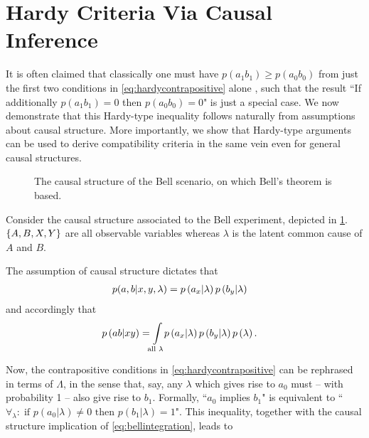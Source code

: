 \section{Hardy Criteria Via Causal Inference}

It is often claimed that classically one must have $p\left(a_1 b_1\right)\geq p\left(a_0 b_0\right)$ from just the first two conditions in  \cref{eq:hardycontrapositive} alone \cite{CabelloHardyInequality}, such that the result ``If additionally $p\left(a_1 b_1\right)=0$ then $p\left(a_0 b_0\right)=0$" is just a special case. We now demonstrate that this Hardy-type inequality follows naturally from assumptions about causal structure. More importantly, we show that Hardy-type arguments can be used to derive compatibility criteria in the same vein even for general causal structures.

\begin{figure}[t!]
\caption{The causal structure of the Bell scenario, on which Bell's theorem is based.}
 \label{fig:BellDAG}
\end{figure}

Consider the causal structure associated to the Bell experiment, depicted in \cref{fig:BellDAG}. $\lbrace{A,B,X,Y\rbrace}$ are all observable variables whereas $\lambda$ is the latent common cause of $A$ and $B$.

The assumption of causal structure dictates that
\begin{align}\begin{split}\label{eq:bellstructure}
p&\lparen a,b|x,y,\lambda\rparen=p\left(a_x|\lambda\right)p\left(b_y|\lambda\right)
\end{split}\end{align}
and accordingly that
\begin{align}\begin{split}\label{eq:bellintegration}
&p\left(ab|xy\right)
=\int\limits_{\mathclap{\text{all }\lambda}}p\left(a_x|\lambda\right)p\left(b_y|\lambda\right)p\left(\lambda\right).
\end{split}\end{align}


Now, the contrapositive conditions in \cref{eq:hardycontrapositive} can be rephrased in terms of $\Lambda$, in the sense that, say, any $\lambda$ which gives rise to $a_0$ must -- with probability 1 -- also give rise to $b_1$. Formally, ``$a_0$ implies $b_1$" is equivalent to ``$\forall_\lambda\!:\;\text{if }p\left(a_0|\lambda\right)\neq 0 \text{ then }p\left(b_1|\lambda\right)=1$". This inequality, together with the causal structure implication of \cref{eq:bellintegration}, leads to


